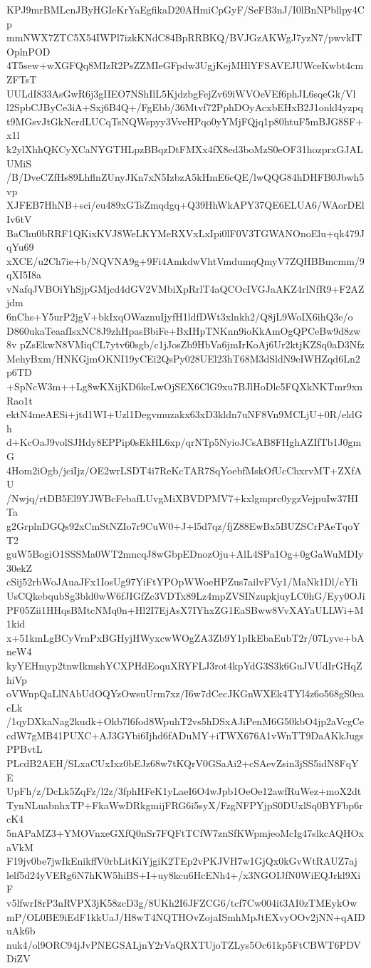 KPJ9mrBMLcnJByHGIeKrYaEgfikaD20AHmiCpGyF/SeFB3nJ/I0lBnNPbllpy4Cp
mmNWX7ZTC5X54IWPl7izkKNdC84BpRRBKQ/BVJGzAKWgJ7yzN7/pwvkITOplnPOD
4T5sew+wXGFQq8MIzR2PsZZMIeGFpdw3UgjKejMHlYFSAVEJUWceKwbt4cmZFTsT
UULdI833AsGwR6j3gIIEO7NShIlL5KjdzbgFejZv69iWVOeVEf6phJL6sqeGk/Vl
l2SpbCJByCe3iA+Sxj6B4Q+/FgEbb/36Mtvf72PphDOyAcxbEHxB2J1onkl4yzpq
t9MGsvJtGkNcrdLUCqTsNQWspyy3VveHPqo0yYMjFQjq1p80htuF5mBJG8SF+x1l
k2ylXhhQKCyXCaNYGTHLpzBBqzDtFMXx4fX8ed3boMzS0eOF31hozprxGJALUMiS
/B/DveCZfHs89LhflnZUnyJKn7xN5IzbzA5kHmE6cQE/lwQQG84hDHFB0Jbwh5vp
XJFEB7HhNB+sci/eu489xGTsZmqdgq+Q39HhWkAPY37QE6ELUA6/WAorDElIv6tV
BaChu0bRRF1QKixKVJ8WeLKYMeRXVxLxIpi0lF0V3TGWANOnoElu+qk479JqYu69
xXCE/u2Ch7ie+b/NQVNA9g+9Fi4AmkdwVhtVmdumqQmyV7ZQHBBmcmm/9qXI5I8a
vNafqJVBOiYhSjpGMjcd4dGV2VMbiXpRrlT4aQCOcIVGJaAKZ4rlNfR9+F2AZjdm
6nChs+Y5urP2jgV+bkIxqOWaznuIjyfH1ldfDWt3xlnkh2/Q8jL9WoIX6ihQ3e/o
D860ukaTeaafIsxNC8J9zhHpasBbiFe+BxIHpTNKnn9ioKkAmOgQPCeBw9d8zw8v
pZsEkwN8VMiqCL7ytv60sgb/c1jJosZb9HbVa6jmIrKoAj6Ur2ktjKZSq0aD3Nfz
MehyBxm/HNKGjmOKNI19yCEi2QsPy028UEl23hT68M3dSldN9eIWHZqd6Ln2p6TD
+SpNcW3m++Lg8wKXijKD6keLwOjSEX6ClG9xu7BJlHoDlc5FQXkNKTmr9xnRao1t
ektN4meAESi+jtd1WI+Uzl1Degvmuzakx63xD3kldn7uNF8Vn9MCLjU+0R/eldGh
d+KcOaJ9volSJHdy8EPPip0sEkHL6xp/qrNTp5NyioJCsAB8FHghAZIfTb1J0gmG
4Hom2iOgb/jciIjz/OE2wrLSDT4i7ReKcTAR7SqYoebfMskOfUcChxrvMT+ZXfAU
/Nwjq/rtDB5El9YJWBcFebafLUvgMiXBVDPMV7+kxlgmprc0ygzVejpuIw37HITa
g2GrplnDGQs92xCmStNZIo7r9CuW0+J+l5d7qz/fjZ88EwBx5BUZSCrPAeTqoYT2
guW5BogiO1SSSMa0WT2mncqJ8wGbpEDnozOju+AlL4SPa1Og+0gGaWuMDIy30ekZ
cSij52rbWoJAuaJFx1IosUg97YiFtYPOpWWoeHPZus7ailvFVy1/MaNk1Dl/cYIi
UsCQkebqubSg3bld0wW6fJIGfZc3VDTx89Lz4mpZVSINzupkjuyLC0hG/Eyy0OJi
PF05Zii1HHqsBMtcNMq0n+Hl2I7EjAsX7IYhxZG1EaSBww8VvXAYaULLWi+M1kid
x+51kmLgBCyVrnPxBGHyjHWyxcwWOgZA3Zb9Y1pIkEbaEubT2r/07Lyve+bAneW4
kyYEHmyp2tnwIkmshYCXPHdEoquXRYFLJ3rot4kpYdG3S3k6GuJVUdIrGHqZhiVp
oVWnpQaLlNAbUdOQYzOwsuUrm7xz/I6w7dCecJKGnWXEk4TYl4z6o568gS0eacLk
/1qyDXkaNag2kudk+Okb7l6fod8WpuhT2vs5hDSxAJiPenM6G50kbO4jp2aVcgCe
cdW7gMB41PUXC+AJ3GYbi6Ijhd6fADuMY+iTWX676A1vWnTT9DaAKkJugsPPBvtL
PLcdB2AEH/SLxaCUxIxz0bEJz68w7tKQrV0GSaAi2+cSAevZsin3jSS5idN8FqYE
UpFh/z/DcLk5ZqFz/l2z/3fphHFeK1yLaeI6O4wJpb1OeOe12awfRuWez+moX2dt
TynNLuabnhxTP+FkaWwDRkgmijFRG6i5syX/FzgNFPYjpS0DUxlSq0BYFbp6rcK4
5nAPaMZ3+YMOVnxeGXfQ0nSr7FQFtTCfW7znSfKWpmjeoMcIg47slkcAQHOxaVkM
F19jv0be7jwIkEnikffV0rbLitKiYjgiK2TEp2vPKJVH7w1GjQx0kGvWtRAUZ7aj
lelf5d24yVERg6N7hKW5hiBS+I+uy8kcu6HcENh4+/x3NGOIJfN0WiEQJrkl9XiF
v5lfwrI8rP3nRVPX3jK58zcD3g/8UKh2I6JFZCG6/tcf7Cw004it3AI0zTMEykOw
mP/OL0BE9iEdF1kkUaJ/H8wT4NQTHOvZojaISmhMpJtEXvyOOv2jNN+qAIDuAk6b
nuk4/ol9ORC94jJvPNEGSALjnY2rVaQRXTUjoTZLys5Oc61kp5FtCBWT6PDVDiZV
